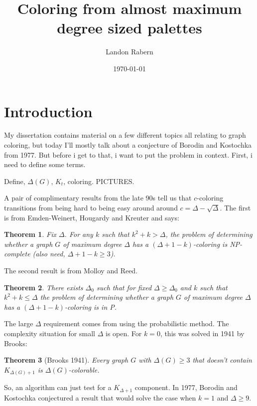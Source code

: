 \documentclass[12pt]{article}
\title{Coloring from almost maximum degree sized palettes}
\author{Landon Rabern}
\date{\today}
\theoremstyle{plain}
\newtheorem{thm}{Theorem}[section]
\theoremstyle{definition}
\theoremstyle{remark}
\begin{document}
\maketitle

\section{Introduction}
My dissertation contains material on a few different topics all relating to graph coloring, but today I'll mostly talk about a conjecture of Borodin and Kostochka from 1977.  But before i get to that, i want to put the problem in context.  First, i need to define some terms.

Define, $\Delta(G)$, $K_t$, coloring.  PICTURES.

\bigskip

A pair of complimentary results from the late 90s tell us that $c$-coloring transitions from being hard to being easy around around $c = \Delta - \sqrt{\Delta}$.  The first is from Emden-Weinert, Hougardy and Kreuter and says:

\begin{thm}
Fix $\Delta$.  For any $k$ such that $k^2 + k > \Delta$, the problem of determining whether a graph $G$ of maximum degree $\Delta$ has a $(\Delta + 1 - k)$-coloring is NP-complete (also need, $\Delta + 1 - k \ge 3$).
\end{thm}

The second result is from Molloy and Reed.

\begin{thm}
There exists $\Delta_0$ such that for fixed $\Delta \geq \Delta_0$ and $k$ such that $k^2 + k \leq \Delta$ the problem of determining whether a graph $G$ of maximum degree $\Delta$ has a $(\Delta + 1 - k)$-coloring is in P.
\end{thm}

The large $\Delta$ requirement comes from using the probabilistic method.  The complexity situation for small $\Delta$ is open.  For $k = 0$, this was solved in 1941 by Brooks:

\begin{thm}[Brooks 1941]
Every graph $G$ with $\Delta(G) \geq 3$ that doesn't contain $K_{\Delta(G) + 1}$ is $\Delta(G)$-colorable.
\end{thm} 

So, an algorithm can just test for a $K_{\Delta + 1}$ component.  In 1977, Borodin and Kostochka conjectured a result that would solve the case when $k = 1$ and $\Delta \geq 9$.
\end{document}

